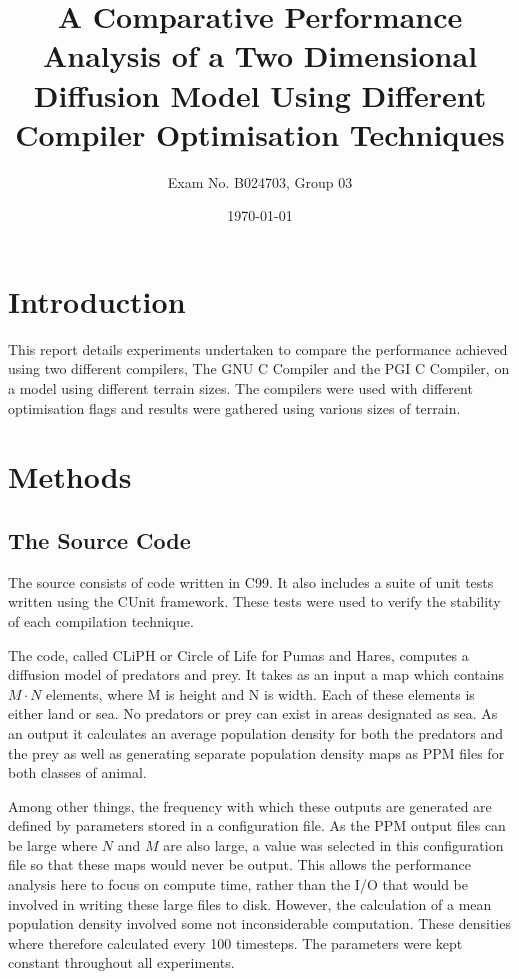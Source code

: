 \documentclass[a4paper,12pt]{article}
\begin{document}
\title{A Comparative Performance Analysis of a Two Dimensional Diffusion Model Using Different Compiler Optimisation Techniques}
\author{Exam No. B024703, Group 03}
\date{\today}
\maketitle

\section{Introduction}

This report details experiments undertaken to compare the performance achieved using two different compilers, The GNU C Compiler and the PGI C Compiler, on a model using different terrain sizes. The compilers were used with different optimisation flags and results were gathered using various sizes of terrain.

\section{Methods}

\subsection{The Source Code}

The source consists of code written in C99. It also includes a suite of unit tests written using the CUnit framework. These tests were used to verify the stability of each compilation technique.

The code, called CLiPH or Circle of Life for Pumas and Hares,  computes a diffusion model of predators and prey. It takes as an input a map which contains $M\cdot N$ elements, where M is height and N is width. Each of these elements is either land or sea. No predators or prey can exist in areas designated as sea. As an output it calculates an average population density for both the predators and the prey as well as generating separate population density maps as PPM files for both classes of animal. 

Among other things, the frequency with which these outputs are generated are defined by parameters stored in a configuration file. As the PPM output files can be large where $N$ and $M$ are also large, a value was selected in this configuration file so that these maps would never be output. This allows the performance analysis here to focus on compute time, rather than the I/O that would be involved in writing these large files to disk. However, the calculation of a mean population density involved some not inconsiderable computation. These densities where therefore calculated every 100 timesteps. The parameters were kept constant throughout all experiments.
\end{document}
